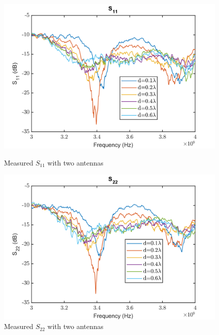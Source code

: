 \begin{figure}[H]
  \centering
  \begin{minipage}[b]{0.5\textwidth}
	\includegraphics[scale = 0.5]{figures/measurement/antennas/spar_two_ant_s11.png}
	\caption{Measured $S_{11}$ with two antennas}
    \label{fig:chamber_two_ant_s11}
  \end{minipage}
  \hfill
  \begin{minipage}[b]{0.4\textwidth}
\includegraphics[scale = 0.5]{figures/measurement/antennas/spar_two_ant_s22.png}
\caption{Measured $S_{22}$ with two antennas}
    \label{fig:chamber_two_ant_s22}
  \end{minipage}
\end{figure}

